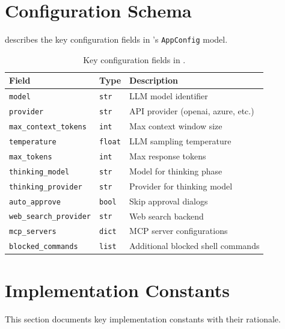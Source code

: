 
\section{Configuration Schema}
\label{app:config}

 describes the key configuration fields in \name's \texttt{AppConfig} model.

\begin{table}[h]
\centering
\caption{Key configuration fields in \name.}
\label{tab:config}
\small
\begin{tabular}{@{}lll@{}}
\toprule
\textbf{Field} & \textbf{Type} & \textbf{Description} \\
\midrule
\texttt{model} & \texttt{str} & LLM model identifier \\
\texttt{provider} & \texttt{str} & API provider (openai, azure, etc.) \\
\texttt{max\_context\_tokens} & \texttt{int} & Max context window size \\
\texttt{temperature} & \texttt{float} & LLM sampling temperature \\
\texttt{max\_tokens} & \texttt{int} & Max response tokens \\
\texttt{thinking\_model} & \texttt{str} & Model for thinking phase \\
\texttt{thinking\_provider} & \texttt{str} & Provider for thinking model \\
\texttt{auto\_approve} & \texttt{bool} & Skip approval dialogs \\
\texttt{web\_search\_provider} & \texttt{str} & Web search backend \\
\texttt{mcp\_servers} & \texttt{dict} & MCP server configurations \\
\texttt{blocked\_commands} & \texttt{list} & Additional blocked shell commands \\
\bottomrule
\end{tabular}
\end{table}

\section{Implementation Constants}
\label{app:constants}

This section documents key implementation constants with their rationale.

